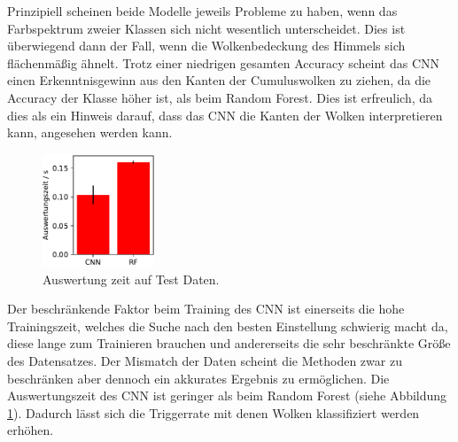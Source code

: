 Prinzipiell scheinen beide Modelle jeweils Probleme zu haben, wenn das 
Farbspektrum zweier Klassen sich nicht wesentlich unterscheidet.
Dies ist überwiegend dann der Fall, wenn die Wolkenbedeckung des Himmels sich
flächenmäßig ähnelt. 
Trotz einer niedrigen gesamten Accuracy scheint das CNN einen 
Erkenntnisgewinn aus den Kanten der Cumuluswolken zu ziehen, da die Accuracy
der Klasse höher ist, als beim Random Forest.
Dies ist erfreulich, da dies als ein Hinweis darauf, dass das CNN 
die Kanten der Wolken interpretieren kann, angesehen werden kann. 

\begin{figure}
		\centering
		\vspace{-0.4cm}
		\includegraphics[width=0.3\textwidth]{pictures/time.pdf}
		\caption{Auswertung zeit auf Test Daten.}
		\label{fig:time}
\end{figure}
Der beschränkende Faktor beim Training des CNN ist einerseits die hohe
Trainingszeit, welches die Suche nach den besten Einstellung schwierig macht da, 
diese lange zum Trainieren brauchen und andererseits die sehr
beschränkte Größe des Datensatzes. 
Der Mismatch der Daten scheint die Methoden zwar zu beschränken aber dennoch
ein akkurates Ergebnis zu ermöglichen.
Die Auswertungszeit des CNN ist geringer als beim Random Forest (siehe Abbildung
\ref{fig:time}). 
Dadurch lässt sich die Triggerrate mit denen Wolken klassifiziert werden
erhöhen.
